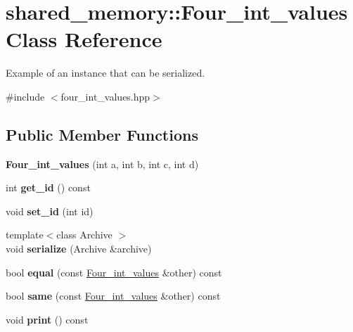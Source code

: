 \hypertarget{classshared__memory_1_1Four__int__values}{}\section{shared\+\_\+memory\+:\+:Four\+\_\+int\+\_\+values Class Reference}
\label{classshared__memory_1_1Four__int__values}


Example of an instance that can be serialized.  




{\ttfamily \#include $<$four\+\_\+int\+\_\+values.\+hpp$>$}

\subsection*{Public Member Functions}
\begin{DoxyCompactItemize}
\item 
\mbox{\label{classshared__memory_1_1Four__int__values_a28e7fda257450d7650926ae4cec8ea21}} 
{\bfseries Four\+\_\+int\+\_\+values} (int a, int b, int c, int d)
\item 
\mbox{\label{classshared__memory_1_1Four__int__values_a90e8357cfc910d419f5d1230118eda22}} 
int {\bfseries get\+\_\+id} () const
\item 
\mbox{\label{classshared__memory_1_1Four__int__values_aa9904f00f9ae680bab360954e5f3f7a9}} 
void {\bfseries set\+\_\+id} (int id)
\item 
\mbox{\label{classshared__memory_1_1Four__int__values_ae19116850c04d24ce74dc28bd9cbcf39}} 
{\footnotesize template$<$class Archive $>$ }\\void {\bfseries serialize} (Archive \&archive)
\item 
\mbox{\label{classshared__memory_1_1Four__int__values_a1ac9c842573728feed000826ced50933}} 
bool {\bfseries equal} (const \hyperlink{classshared__memory_1_1Four__int__values}{Four\+\_\+int\+\_\+values} \&other) const
\item 
\mbox{\label{classshared__memory_1_1Four__int__values_a64ae65fa773ceca652e78b551466ec9e}} 
bool {\bfseries same} (const \hyperlink{classshared__memory_1_1Four__int__values}{Four\+\_\+int\+\_\+values} \&other) const
\item 
\mbox{\label{classshared__memory_1_1Four__int__values_a904e1a3c7724cf9ddb43e62418f87eb0}} 
void {\bfseries print} () const
\end{DoxyCompactItemize}
